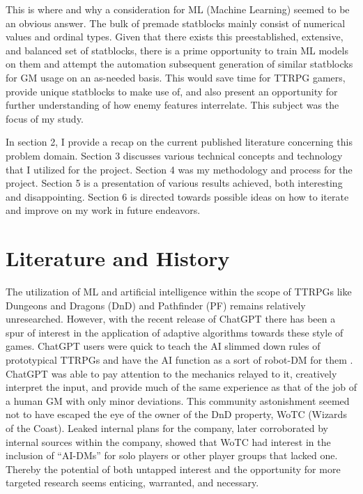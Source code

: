 \documentclass[11pt]{article}
\begin{document}
This is where and why a consideration for ML (Machine Learning) seemed to be an obvious answer. The bulk of premade statblocks mainly consist of numerical values and ordinal types. Given that there exists this preestablished, extensive, and balanced set of statblocks, there is a prime opportunity to train ML models on them and attempt the automation subsequent generation of similar statblocks for GM usage on an as-needed basis. This would save time for TTRPG gamers, provide unique statblocks to make use of, and also present an opportunity for further understanding of how enemy features interrelate. This subject was the focus of my study. 

In section 2, I provide a recap on the current published literature concerning this problem domain. Section 3 discusses various technical concepts and technology that I utilized for the project. Section 4 was my methodology and process for the project. Section 5 is a presentation of various results achieved, both interesting and disappointing. Section 6 is directed towards possible ideas on how to iterate and improve on my work in future endeavors.

\section{Literature and History}

The utilization of ML and artificial intelligence within the scope of TTRPGs like Dungeons and Dragons (DnD) and Pathfinder (PF) remains relatively unresearched. However, with the recent release of ChatGPT \cite{openai_2023} there has been a spur of interest in the application of adaptive algorithms towards these style of games. ChatGPT users were quick to teach the AI slimmed down rules of prototypical TTRPGs and have the AI function as a sort of robot-DM for them \cite{murray_2022}. ChatGPT was able to pay attention to the mechanics relayed to it, creatively interpret the input, and provide much of the same experience as that of the job of a human GM with only minor deviations. This community astonishment seemed not to have escaped the eye of the owner of the DnD property, WoTC (Wizards of the Coast). Leaked internal plans for the company, later corroborated by internal sources within the company, showed that WoTC had interest in the inclusion of ``AI-DMs'' \cite{law_2023} for solo players or other player groups that lacked one. Thereby the potential of both untapped interest and the opportunity for more targeted research seems enticing, warranted, and necessary.
\end{document}
